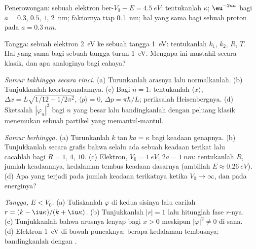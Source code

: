 \begin{exercise}[$\star$]\label{exo:b2:potential-wells-tunneling:3}
Penerowongan: sebuah elektron ber-$V_0 - E = \qty{4.5}{eV}$: tentukanlah $\kappa$; $\eu^{-2\kappa a}$
bagi $a = 0.3$, $0.5$, $1$, \qty{2}{nm}; faktornya tiap \qty{0.1}{nm}; hal yang sama bagi
sebuah proton pada $a = \qty{0.3}{nm}$.
\end{exercise}

\begin{exercise}[$\star$]\label{exo:b2:potential-wells-tunneling:4}
Tangga: sebuah elektron \qty{2}{eV} ke sebuah tangga \qty{1}{eV}: tentukanlah $k_1$, $k_2$,
$R$, $T$. Hal yang sama bagi sebuah tangga turun \qty{1}{eV}. Mengapa ini mustahil
secara klasik, dan apa analoginya bagi cahaya?
\end{exercise}

\begin{exercise}[$\star\star$]\label{exo:b2:potential-wells-tunneling:5}
\emph{Sumur takhingga secara rinci.} (a) Turunkanlah arasnya lalu normalkanlah.
(b) Tunjukkanlah keortogonalannya. (c) Bagi $n = 1$: tentukanlah $\langle x\rangle$, $\Delta x =
L\sqrt{1/12 - 1/2\pi^2}$, $\langle p\rangle = 0$, $\Delta p = \pi\hbar/L$; periksalah
Heisenbergnya. (d) Sketsalah $|\varphi_n|^2$ bagi $n$ yang besar lalu bandingkanlah dengan
peluang klasik menemukan sebuah partikel yang memantul-mantul.
\end{exercise}

\begin{exercise}[$\star\star$]\label{exo:b2:potential-wells-tunneling:6}
\emph{Sumur berhingga.} (a) Turunkanlah $k\tan ka = \kappa$ bagi keadaan genapnya.
(b) Tunjukkanlah secara grafis bahwa selalu ada sebuah keadaan terikat lalu cacahlah bagi
$R = 1$, $4$, $10$. (c) Elektron, $V_0 = \qty{1}{eV}$, $2a = \qty{1}{nm}$:
tentukanlah $R$, jumlah keadaannya, kedalaman tembus keadaan dasarnya (ambillah
$E \approx \qty{0.26}{eV}$). (d) Apa yang terjadi pada jumlah keadaan terikatnya
ketika $V_0 \to \infty$, dan pada energinya?
\end{exercise}

\begin{exercise}[$\star\star$]\label{exo:b2:potential-wells-tunneling:7}
\emph{Tangga, $E < V_0$.} (a) Tuliskanlah $\varphi$ di kedua sisinya lalu carilah $r =
(k - \iu\kappa)/(k + \iu\kappa)$. (b) Tunjukkanlah $|r| = 1$ lalu hitunglah fase
$r$-nya. (c) Tunjukkanlah bahwa arusnya lenyap bagi $x > 0$ meskipun $|\varphi|^2 \ne
0$ di sana. (d) Elektron \qty{1}{eV} di bawah puncaknya: berapa kedalaman tembusnya;
bandingkanlah dengan  .
\end{exercise}

